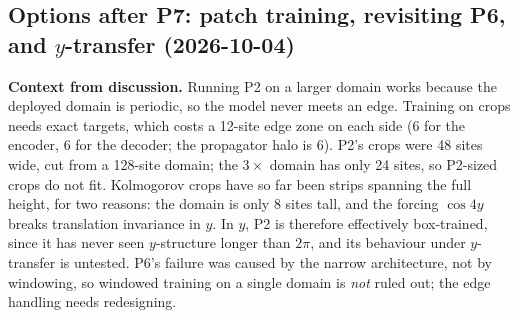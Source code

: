 \documentclass[11pt]{article}
\begin{document}
\subsection{Options after P7: patch training, revisiting P6, and $y$-transfer (2026-10-04)}
\label{sec:post_p7_options}

\textbf{Context from discussion.} Running P2 on a larger domain works
because the deployed domain is periodic, so the model never meets an
edge. Training on crops needs exact targets, which costs a 12-site edge
zone on each side (6 for the encoder, 6 for the decoder; the propagator
halo is 6). P2's crops were 48 sites wide, cut from a 128-site domain;
the $3\times$ domain has only 24 sites, so P2-sized crops do not fit.
Kolmogorov crops have so far been strips spanning the full height, for
two reasons: the domain is only 8 sites tall, and the forcing $\cos4y$
breaks translation invariance in $y$. In $y$, P2 is therefore
effectively box-trained, since it has never seen $y$-structure longer
than $2\pi$, and its behaviour under $y$-transfer is untested. P6's
failure was caused by the narrow architecture, not by windowing, so
windowed training on a single domain is \emph{not} ruled out; the edge
handling needs redesigning.
\end{document}
